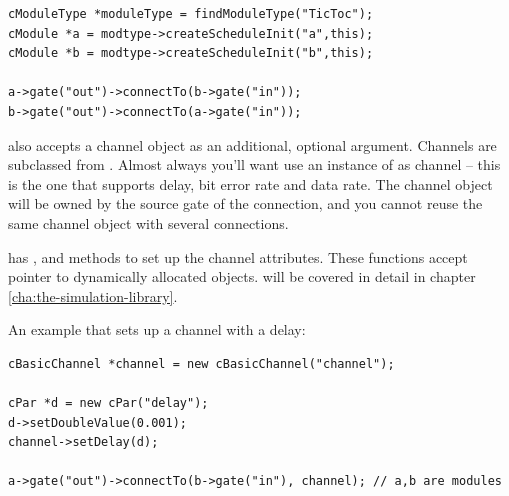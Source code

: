 \begin{verbatim}
cModuleType *moduleType = findModuleType("TicToc");
cModule *a = modtype->createScheduleInit("a",this);
cModule *b = modtype->createScheduleInit("b",this);

a->gate("out")->connectTo(b->gate("in"));
b->gate("out")->connectTo(a->gate("in"));
\end{verbatim}

 also accepts a channel object as an
additional, optional argument. Channels are subclassed from
. Almost always you'll want use an instance of
 as channel -- this is the one that supports
delay, bit error rate 
and data rate. The channel object will
be owned by the source gate of the connection, and you cannot
reuse the same channel object with several connections.

 has , 
and  methods to set up the channel attributes.
These functions accept pointer to dynamically allocated
 objects.  will be covered in detail
in chapter \ref{cha:the-simulation-library}.

An example that sets up a channel with a delay:

\begin{verbatim}
cBasicChannel *channel = new cBasicChannel("channel");

cPar *d = new cPar("delay");
d->setDoubleValue(0.001);
channel->setDelay(d);

a->gate("out")->connectTo(b->gate("in"), channel); // a,b are modules
\end{verbatim}




